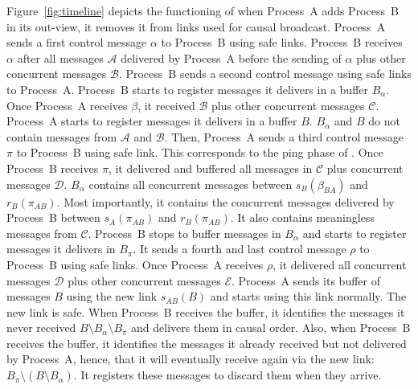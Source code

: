 Figure~\ref{fig:timeline} depicts the functioning of \RPCBROADCAST when
Process~A adds Process~B in its out-view, it removes it from links used for
causal broadcast. Process~A sends a first control message $\alpha$ to Process~B
using safe links. Process~B receives $\alpha$ after all messages $\mathcal{A}$
delivered by Process~A before the sending of $\alpha$ plus other concurrent
messages $\mathcal{B}$. Process~B sends a second control message using safe
links to Process~A. Process~B starts to register messages it delivers in a
buffer $B_\alpha$.  Once Process~A receives $\beta$, it received $\mathcal{B}$
plus other concurrent messages $\mathcal{C}$. Process~A starts to register
messages it delivers in a buffer $B$. $B_\alpha$ and $B$ do not contain messages
from $\mathcal{A}$ and $\mathcal{B}$. Then, Process~A sends a third control
message $\pi$ to Process~B using safe link. This corresponds to the ping phase
of \PCBROADCAST.  Once Process~B receives $\pi$, it delivered and buffered all
messages in $\mathcal{C}$ plus concurrent messages $\mathcal{D}$. $B_\alpha$
contains all concurrent messages between $s_B(\beta_{BA})$ and
$r_B(\pi_{AB})$. Most importantly, it contains the concurrent messages delivered
by Process~B between $s_A(\pi_{AB})$ and $r_B(\pi_{AB})$. It also contains
meaningless messages from $\mathcal{C}$.  Process~B stops to buffer messages in
$B_\alpha$ and starts to register messages it delivers in $B_\pi$. It sends a
fourth and last control message $\rho$ to Process~B using safe links. Once
Process~A receives $\rho$, it delivered all concurrent messages $\mathcal{D}$
plus other concurrent messages $\mathcal{E}$. Process~A sends its buffer of
messages $B$ using the new link $s_{AB}(B)$ and starts using this link
normally. The new link is safe. When Process~B receives the buffer, it
identifies the messages it never received $B\setminus B_\alpha \setminus B_\pi$
and delivers them in causal order. Also, when Process~B receives the buffer, it
identifies the messages it already received but not delivered by Process~A,
hence, that it will eventually receive again via the new link:
$B_\pi \setminus (B \setminus B_\alpha)$.  It registers these messages to
discard them when they arrive.

\begin{figure*}
  \begin{center}
    
    \caption{\label{fig:timeline}Timeline of \RPCBROADCAST when Process~A adds a
      link to Process~B in its out-view. We hide intermediate processes for the
      purpose of clarity. Messages arrive in causal order.}
  \end{center}
\end{figure*}

